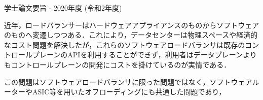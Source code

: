 学士論文要旨 - 2020年度 (令和2年度)
\begin{center}
\begin{large}
\end{large}
\end{center}

近年，ロードバランサーはハードウェアアプライアンスのものからソフトウェアのものへ変遷しつつある．これにより，データセンターは物理スペースや経済的なコスト問題を解決したが，これらのソフトウェアロードバランサは既存のコントロールプレーンのAPIを利用することができず，利用者はデータプレーンよりもコントロールプレーンの開発にコストを掛けているのが実情である．

この問題はソフトウェアロードバランサに限った問題ではなく，ソフトウェアルーターやASIC等を用いたオフローディングにも共通した問題であり，





